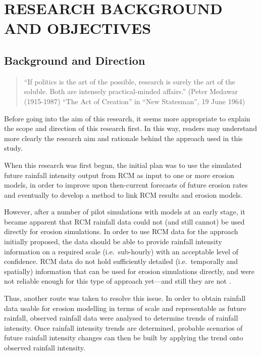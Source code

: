 \chapter{RESEARCH BACKGROUND AND OBJECTIVES}
\label{sec:RESEARCHOBJECTIVES}

\section{Background and Direction}
\label{sec:ResearchBackgroundandDirection}

\begin{quotation}
\small ``If politics is the art of the possible, research is surely the art of
the soluble. Both are intensely practical-minded affairs.'' (Peter Medawar
(1915-1987) ``The Act of Creation'' in ``New Statesman'', 19 June 1964)
\end{quotation}

Before going into the aim of this research, it seems more appropriate to explain
the scope and direction of this research first. In this way, readers may
understand more clearly the research aim and rationale behind the approach used
in this study.

When this research was first begun, the initial plan was to use the simulated
future rainfall intensity output from RCM as input to one or more erosion
models, in order to improve upon then-current forecasts of future erosion rates
and eventually to develop a method to link RCM results and erosion models.

However, after a number of pilot simulations with models at an early stage, it
became apparent that RCM rainfall data could not (and still cannot) be used
directly for erosion simulations. In order to use RCM data for the approach
initially proposed, the data should be able to provide rainfall intensity
information on a required scale (i.e.\ sub-hourly) with an acceptable level of
confidence. RCM data do not hold sufficiently detailed (i.e.\ temporally and
spatially) information that can be used for erosion simulations directly, and
were not reliable enough for this type of approach yet---and still they are not
\citep{nearing2001-229,michael2005-155,o'neal2005-165}.

Thus, another route was taken to resolve this issue. In order to obtain rainfall
data usable for erosion modelling in terms of scale and representable as
future rainfall, observed rainfall data were analysed to determine trends of
rainfall intensity. Once rainfall intensity trends are determined, probable
scenarios of future rainfall intensity changes can then be built by applying the
trend onto observed rainfall intensity.

